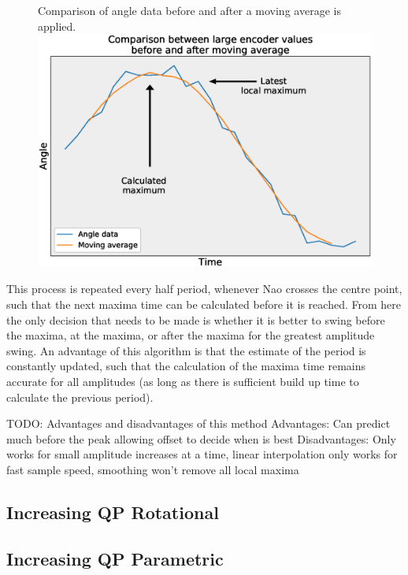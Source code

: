 \documentclass[11pt]{article}
\begin{document}
    \begin{figure}[!htb]
        \centering
        \captionbox
             {Comparison of angle data before and after a moving average is applied.\label{MovingAverageDiagram}}
             {\includegraphics[width=1.0\textwidth]{MovingAverageDiagram.eps}}
    \end{figure}


This process is repeated every half period, whenever Nao crosses the centre point, such that the next maxima time can be calculated before it is reached. From here the only decision that needs to be made is whether it is better to swing before the maxima, at the maxima, or after the maxima for the greatest amplitude swing. An advantage of this algorithm is that the estimate of the period is constantly updated, such that the calculation of the maxima time remains accurate for all amplitudes (as long as there is sufficient build up time to calculate the previous period).

TODO: Advantages and disadvantages of this method
Advantages: Can predict much before the peak allowing offset to decide when is best  
Disadvantages: Only works for small amplitude increases at a time, linear interpolation only works for fast sample speed, smoothing won't remove all local maxima

\subsection{Increasing QP Rotational}
\subsection{Increasing QP Parametric}
\end{document}
